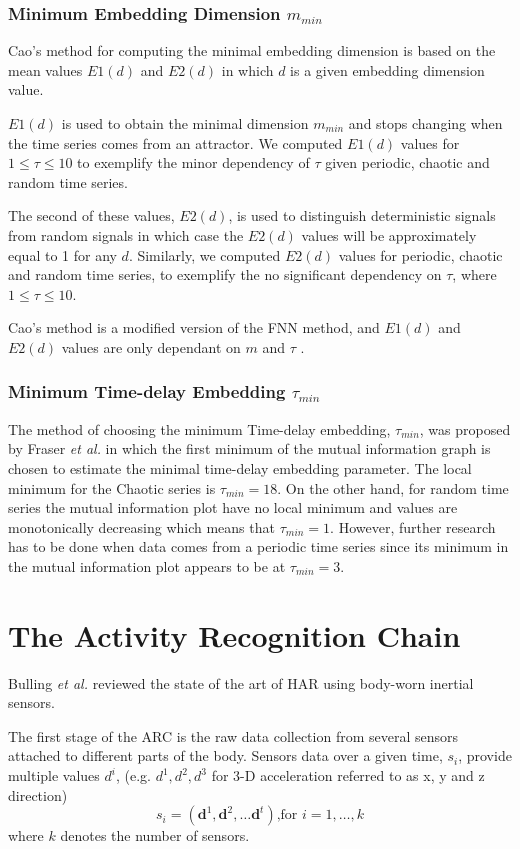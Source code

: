 \documentclass[10pt,journal,compsoc]{IEEEtran}
\begin{document}
\subsubsection{Minimum Embedding Dimension $m_{min}$}
Cao's method \cite{Cao1997} for computing the minimal embedding dimension is based on
the mean values $E1(d)$ and $E2(d)$ in which $d$ is a given embedding dimension value.

$E1(d)$ is used to obtain the minimal dimension $m_{min}$ and stops changing
when the time series comes from an attractor.
We computed $E1(d)$ values for $1 \leq \tau \leq 10$ to exemplify
the minor dependency of $\tau$ given periodic, chaotic and random time series.

The second of these values, $E2(d)$, is used to distinguish
deterministic signals from random signals in which case the $E2(d)$ values will be approximately
equal to 1 for any $d$.
Similarly, we computed $E2(d)$ values for periodic, chaotic and random time series,
to exemplify the no significant dependency on $\tau$, where $1 \leq \tau \leq 10$.

Cao's method is a modified version of the FNN method, and $E1(d)$ and
$E2(d)$ values are only dependant on $m$ and $\tau$ \cite{Cao1997}.

\subsubsection{Minimum Time-delay Embedding  $\tau_{min}$}
The method of choosing the minimum Time-delay embedding, $\tau_{min}$, was proposed
by Fraser \emph{et al.}  in which the first minimum of the mutual
information graph is chosen to estimate the minimal time-delay embedding parameter.
The local minimum for the Chaotic series is $\tau_{min} = 18$.
On the other hand, for random time series the mutual information plot have no local minimum
and values are monotonically decreasing which means that $\tau_{min} = 1$.
However, further research has to be done when data comes from a periodic time series
since its minimum in the mutual information plot appears to be at $\tau_{min} = 3$.

\section{The Activity Recognition Chain}

Bulling \emph{et al.} \cite{bulling2014} reviewed the state of the art of
HAR using body-worn inertial sensors.

The first stage of the ARC is the raw data collection from several sensors attached to
different parts of the body. Sensors data over a given time, $s_i$, provide multiple values  $d^i$,
(e.g. $d^1, d^2, d^3$ for 3-D acceleration referred to as x, y and z direction)
\begin{equation}
s_i = (\textbf{d}^1, \textbf{d}^2,\dots \textbf{d}^t) \mbox{,for } i=1, \dots,k
\end{equation}
where $k$ denotes the number of sensors.
\end{document}
